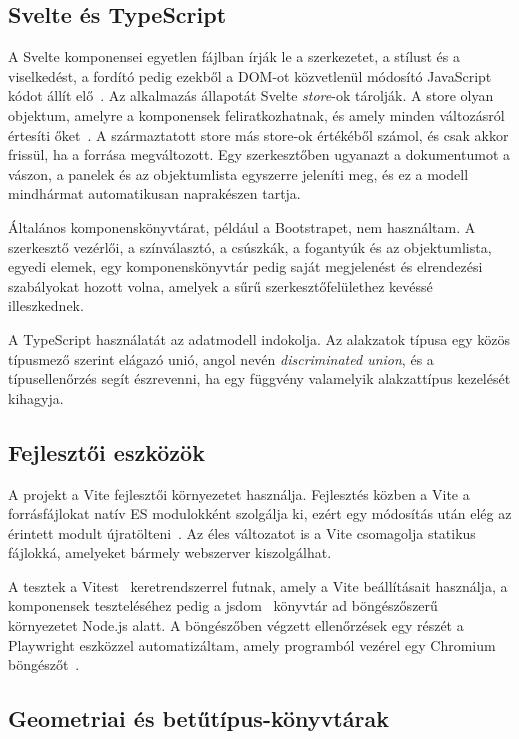 \subsection{Svelte és TypeScript}

A Svelte komponensei egyetlen fájlban írják le a szerkezetet, a stílust és a viselkedést, a fordító pedig ezekből a DOM-ot közvetlenül módosító JavaScript kódot állít elő~\cite{svelte-overview}. Az alkalmazás állapotát Svelte \textit{store}-ok tárolják. A store olyan objektum, amelyre a komponensek feliratkozhatnak, és amely minden változásról értesíti őket~\cite{svelte-stores}. A származtatott store más store-ok értékéből számol, és csak akkor frissül, ha a forrása megváltozott. Egy szerkesztőben ugyanazt a dokumentumot a vászon, a panelek és az objektumlista egyszerre jeleníti meg, és ez a modell mindhármat automatikusan naprakészen tartja.

Általános komponenskönyvtárat, például a Bootstrapet, nem használtam. A szerkesztő vezérlői, a színválasztó, a csúszkák, a fogantyúk és az objektumlista, egyedi elemek, egy komponenskönyvtár pedig saját megjelenést és elrendezési szabályokat hozott volna, amelyek a sűrű szerkesztőfelülethez kevéssé illeszkednek.

A TypeScript használatát az adatmodell indokolja. Az alakzatok típusa egy közös típusmező szerint elágazó unió, angol nevén \textit{discriminated union}, és a típusellenőrzés segít észrevenni, ha egy függvény valamelyik alakzattípus kezelését kihagyja.

\subsection{Fejlesztői eszközök}

A projekt a Vite fejlesztői környezetet használja. Fejlesztés közben a Vite a forrásfájlokat natív ES modulokként szolgálja ki, ezért egy módosítás után elég az érintett modult újratölteni~\cite{vite}. Az éles változatot is a Vite csomagolja statikus fájlokká, amelyeket bármely webszerver kiszolgálhat.

A tesztek a Vitest~\cite{vitest} keretrendszerrel futnak, amely a Vite beállításait használja, a komponensek teszteléséhez pedig a jsdom~\cite{jsdom} könyvtár ad böngészőszerű környezetet Node.js alatt. A böngészőben végzett ellenőrzések egy részét a Playwright eszközzel automatizáltam, amely programból vezérel egy Chromium böngészőt~\cite{playwright}.

\subsection{Geometriai és betűtípus-könyvtárak}


